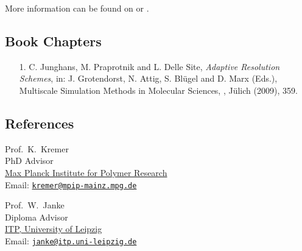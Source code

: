 \documentclass{article}
\begin{document}
More information can be found on  or .

\subsection*{Book Chapters}

\begin{enumerate}
\item[1.] C. Junghans, M. Praprotnik and L. Delle Site,
  \textit{Adaptive Resolution Schemes},
  in: J. Grotendorst, N. Attig, S. Bl{\"u}gel and D. Marx (Eds.),
  Multiscale Simulation Methods in Molecular Sciences, , J{\"u}lich (2009), 359.
\end{enumerate}

\subsection*{References}

\begin{minipage}{0.45\linewidth}
Prof.\ K.\ Kremer
\vspace{-2mm}\\
{\tiny PhD Advisor}\\
\href{http://www.mpip-mainz.mpg.de}{Max Planck Institute for Polymer Research} \\
Email: \href{mailto:kremer@mpip-mainz.mpg.de}{\tt kremer@mpip-mainz.mpg.de}
\end{minipage}
\begin{minipage}{0.45\linewidth}
Prof.\ W.\ Janke
\vspace{-2mm}\\
{\tiny Diploma Advisor}\\
\href{http://www.physik.uni-leipzig.de/~janke/}{ITP, University of Leipzig} \\
Email: \href{mailto:janke@itp.uni-leipzig.de}{\tt janke@itp.uni-leipzig.de}
\end{minipage}
\end{document}
